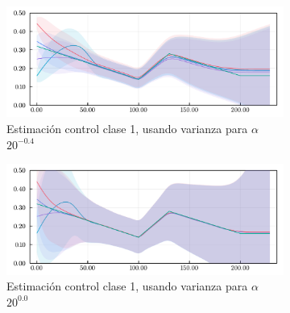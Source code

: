 \begin{figure}[H]
\begin{subfigure}[b]{0.47\textwidth}
\end{subfigure} 
\hfill
\begin{subfigure}[b]{0.47\textwidth}
     \centering
     \includegraphics[width=\textwidth]{img/resultados/synth/sensialphacov_alphacov0-302_0alphaini0-15_0-1_0-45_high1_b2real1-88_gereal0-1961_gireal0-1389_acov0-8_aini0-27675_gcov0-05gamma_e_0-1961_gamma_i_0-1389_beta_2_1-8800.pdf}
     \caption{Estimación control clase 1, usando varianza para \(\alpha\) \(20^{-0.4}\)}
     \label{fig:legend-sensi-acov-class1--e}
\end{subfigure} 
\hfill
\begin{subfigure}[b]{0.47\textwidth}
     \centering
     \includegraphics[width=\textwidth]{img/resultados/synth/sensialphacov_alphacov1-000_0alphaini0-15_0-1_0-45_high1_b2real1-88_gereal0-1961_gireal0-1389_acov0-8_aini0-27675_gcov0-05gamma_e_0-1961_gamma_i_0-1389_beta_2_1-8800.pdf}
     \caption{Estimación control clase 1, usando varianza para \(\alpha\) \(20^{0.0}\)}
     \label{fig:legend-sensi-acov-class1--f}
\end{subfigure} 
\hfill
\begin{subfigure}[b]{0.75\textwidth}

\end{subfigure}
\end{figure}
